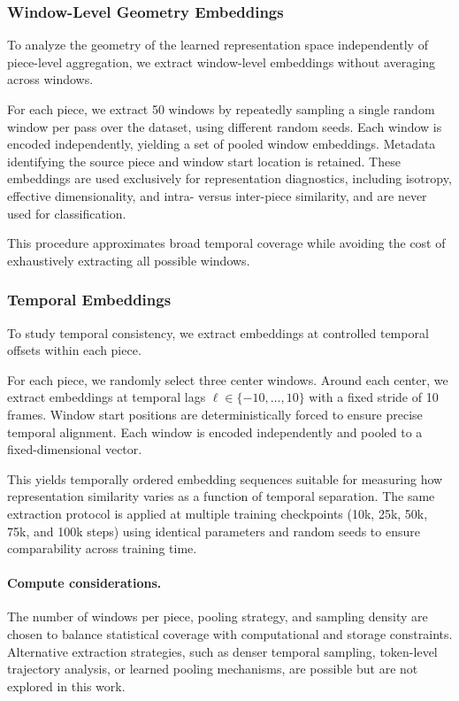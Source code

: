 \documentclass[10pt,twocolumn]{article}
\begin{document}
\subsubsection{Window-Level Geometry Embeddings}
To analyze the geometry of the learned representation space independently of piece-level aggregation, we extract window-level embeddings without averaging across windows.

For each piece, we extract 50 windows by repeatedly sampling a single random window per pass over the dataset, using different random seeds. Each window is encoded independently, yielding a set of pooled window embeddings. Metadata identifying the source piece and window start location is retained. These embeddings are used exclusively for representation diagnostics, including isotropy, effective dimensionality, and intra- versus inter-piece similarity, and are never used for classification.

This procedure approximates broad temporal coverage while avoiding the cost of exhaustively extracting all possible windows.

\subsubsection{Temporal Embeddings}
To study temporal consistency, we extract embeddings at controlled temporal offsets within each piece.

For each piece, we randomly select three center windows. Around each center, we extract embeddings at temporal lags $\ell \in \{-10, \dots, 10\}$ with a fixed stride of 10 frames. Window start positions are deterministically forced to ensure precise temporal alignment. Each window is encoded independently and pooled to a fixed-dimensional vector.

This yields temporally ordered embedding sequences suitable for measuring how representation similarity varies as a function of temporal separation. The same extraction protocol is applied at multiple training checkpoints (10k, 25k, 50k, 75k, and 100k steps) using identical parameters and random seeds to ensure comparability across training time.

\paragraph{Compute considerations.}
The number of windows per piece, pooling strategy, and sampling density are chosen to balance statistical coverage with computational and storage constraints. Alternative extraction strategies, such as denser temporal sampling, token-level trajectory analysis, or learned pooling mechanisms, are possible but are not explored in this work.
\end{document}
